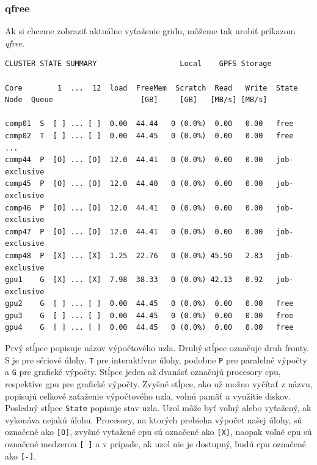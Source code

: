 \subsubsection{qfree}
Ak si chceme zobraziť aktuálne vyťaženie gridu, môžeme tak urobiť príkazom \textit{qfree}.
\begin{lstlisting}[caption={qfree}]
CLUSTER STATE SUMMARY                   Local    GPFS Storage

Core        1  ...  12  load  FreeMem  Scratch  Read   Write  State
Node  Queue                    [GB]     [GB]   [MB/s] [MB/s]
 
comp01  S  [ ] ... [ ]  0.00  44.44   0 (0.0%)  0.00   0.00   free
comp02  T  [ ] ... [ ]  0.00  44.45   0 (0.0%)  0.00   0.00   free
...
comp44  P  [O] ... [O]  12.0  44.41   0 (0.0%)  0.00   0.00   job-exclusive
comp45  P  [O] ... [O]  12.0  44.40   0 (0.0%)  0.00   0.00   job-exclusive
comp46  P  [O] ... [O]  12.0  44.41   0 (0.0%)  0.00   0.00   job-exclusive
comp47  P  [O] ... [O]  12.0  44.41   0 (0.0%)  0.00   0.00   job-exclusive
comp48  P  [X] ... [X]  1.25  22.76   0 (0.0%) 45.50   2.83   job-exclusive
gpu1    G  [X] ... [X]  7.98  38.33   0 (0.0%) 42.13   0.92   job-exclusive
gpu2    G  [ ] ... [ ]  0.00  44.45   0 (0.0%)  0.00   0.00   free
gpu3    G  [ ] ... [ ]  0.00  44.45   0 (0.0%)  0.00   0.00   free
gpu4    G  [ ] ... [ ]  0.00  44.45   0 (0.0%)  0.00   0.00   free
\end{lstlisting}
Prvý stĺpec popisuje názov výpočtového uzla. Druhý stĺpec označuje druh fronty. S je pre sériové úlohy, \texttt{T} pre interaktívne úlohy,
podobne \texttt{P} pre paralelné výpočty a \texttt{G} pre grafické výpočty.
Stĺpce jeden až dvanásť označujú procesory \acrshort{cpu}, respektíve \acrshort{gpu} pre grafické výpočty.
Zvyšné stĺpce, ako už možno vyčítať z názvu, popisujú celkové zaťaženie výpočtového uzla, volnú pamäť a využitie diskov.
Posledný stĺpec \texttt{State} popisuje stav uzla. Uzol môže byť voľný alebo vyťažený, ak vykonáva nejakú úlohu.
Procesory, na ktorých prebieha výpočet našej úlohy, sú označené ako \texttt{[O]}, zvyšné vyťažené \acrshort{cpu} sú označené ako \texttt{[X]},
naopak voľné \acrshort{cpu} sú označené medzerou \texttt{[ ]} a v prípade, ak uzol nie je dostupný, budú \acrshort{cpu} označené ako \texttt{[-]}.

